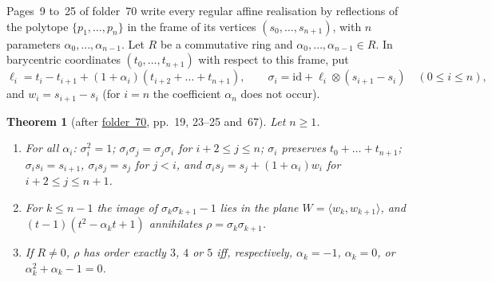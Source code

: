 \documentclass[11pt,a4paper]{amsart}
\newtheorem{theorem}{Theorem}[section]
\theoremstyle{definition}
\theoremstyle{remark}
\newcommand{\id}{\mathrm{id}}
\newcommand{\fac}[1]{\href{https://grothendieck.umontpellier.fr/#1.pdf}{folder~#1}}
\begin{document}
Pages~9 to~25 of folder~70 write every regular affine realisation by reflections of the polytope $\{p_1, \dots, p_n\}$ in the frame of its vertices $(s_0, \dots, s_{n+1})$, with $n$ parameters $\alpha_0, \dots, \alpha_{n-1}$. Let $R$ be a commutative ring and $\alpha_0, \dots, \alpha_{n-1} \in R$. In barycentric coordinates $(t_0, \dots, t_{n+1})$ with respect to this frame, put
\[
\ell_i = t_i - t_{i+1} + (1 + \alpha_i)(t_{i+2} + \dots + t_{n+1}), \qquad \sigma_i = \id + \ell_i \otimes (s_{i+1} - s_i) \quad (0 \le i \le n),
\]
and $w_i = s_{i+1} - s_i$ (for $i = n$ the coefficient $\alpha_n$ does not occur).

\begin{theorem}[after \fac{70}, pp.~19, 23--25 and~67]\label{thm:univ}
Let $n \ge 1$.
\begin{enumerate}
\item For all $\alpha_i$: $\sigma_i^2 = 1$; $\sigma_i\sigma_j = \sigma_j\sigma_i$ for $i + 2 \le j \le n$; $\sigma_i$ preserves $t_0 + \dots + t_{n+1}$; $\sigma_is_i = s_{i+1}$, $\sigma_is_j = s_j$ for $j < i$, and $\sigma_is_j = s_j + (1 + \alpha_i)w_i$ for $i + 2 \le j \le n+1$.
\item For $k \le n - 1$ the image of $\sigma_k\sigma_{k+1} - 1$ lies in the plane $W = \langle w_k, w_{k+1}\rangle$, and $(t - 1)(t^2 - \alpha_kt + 1)$ annihilates $\rho = \sigma_k\sigma_{k+1}$.
\item If $R \ne 0$, $\rho$ has order exactly $3$, $4$ or $5$ iff, respectively, $\alpha_k = -1$, $\alpha_k = 0$, or $\alpha_k^2 + \alpha_k - 1 = 0$.
\end{enumerate}
\end{theorem}
\end{document}
